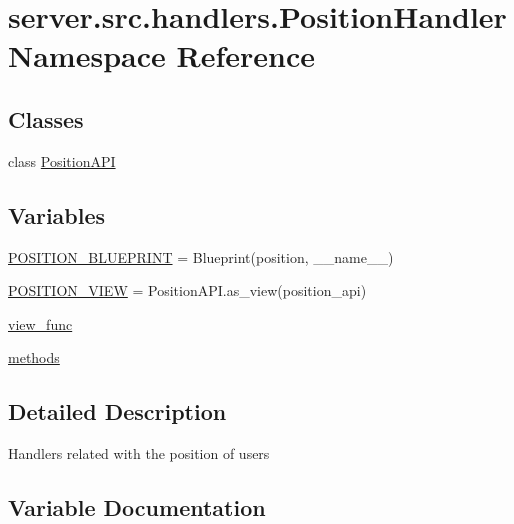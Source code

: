 \hypertarget{namespaceserver_1_1src_1_1handlers_1_1_position_handler}{}\section{server.\+src.\+handlers.\+Position\+Handler Namespace Reference}
\label{namespaceserver_1_1src_1_1handlers_1_1_position_handler}
\subsection*{Classes}
\begin{DoxyCompactItemize}
\item 
class \hyperlink{classserver_1_1src_1_1handlers_1_1_position_handler_1_1_position_a_p_i}{Position\+A\+PI}
\end{DoxyCompactItemize}
\subsection*{Variables}
\begin{DoxyCompactItemize}
\item 
\hyperlink{namespaceserver_1_1src_1_1handlers_1_1_position_handler_af32524e2038716670566b3c521694b2d}{P\+O\+S\+I\+T\+I\+O\+N\+\_\+\+B\+L\+U\+E\+P\+R\+I\+NT} = Blueprint(\textquotesingle{}position\textquotesingle{}, \+\_\+\+\_\+name\+\_\+\+\_\+)
\item 
\hyperlink{namespaceserver_1_1src_1_1handlers_1_1_position_handler_acacbb3f690b46e8115e7b0bd92ea2929}{P\+O\+S\+I\+T\+I\+O\+N\+\_\+\+V\+I\+EW} = Position\+A\+P\+I.\+as\+\_\+view(\textquotesingle{}position\+\_\+api\textquotesingle{})
\item 
\hyperlink{namespaceserver_1_1src_1_1handlers_1_1_position_handler_a607534a21aea57e3bcf30c922e2e575c}{view\+\_\+func}
\item 
\hyperlink{namespaceserver_1_1src_1_1handlers_1_1_position_handler_a4ef9b677a2f5dbe64fdde90cebed0fd0}{methods}
\end{DoxyCompactItemize}


\subsection{Detailed Description}
\begin{DoxyVerb}Handlers related with the position of users\end{DoxyVerb}
 

\subsection{Variable Documentation}
